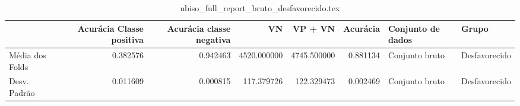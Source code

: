 \begin{table}
\centering
\caption{nbiso_full_report_bruto_desfavorecido.tex}
\label{nbiso_full_report_bruto_desfavorecido.tex}
\begin{tabular}{lrrrrrll}
\toprule
{}              &  Acurácia Classe positiva &  Acurácia classe negativa &          VN  &     VP + VN  &  Acurácia & Conjunto de dados &          Grupo \\
\midrule
Média dos Folds &                  0.382576 &                  0.942463 &  4520.000000 &  4745.500000 &  0.881134 &    Conjunto bruto &  Desfavorecido \\
Desv. Padrão    &                  0.011609 &                  0.000815 &   117.379726 &   122.329473 &  0.002469 &    Conjunto bruto &  Desfavorecido \\
\bottomrule
\end{tabular}
\end{table}
